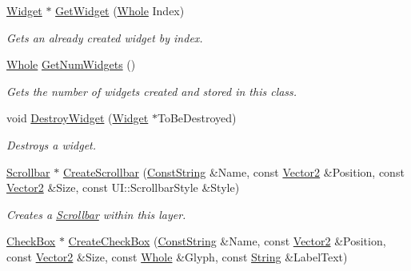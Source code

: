 \begin{DoxyCompactItemize}
\hyperlink{classphys_1_1UI_1_1Widget}{Widget} $\ast$ \hyperlink{classphys_1_1UI_1_1Layer_a8506cbb9fda26895300e4ade376754ab}{GetWidget} (\hyperlink{namespacephys_a460f6bc24c8dd347b05e0366ae34f34a}{Whole} Index)
\begin{DoxyCompactList}\small\item\em Gets an already created widget by index. \item\end{DoxyCompactList}\item 
\hyperlink{namespacephys_a460f6bc24c8dd347b05e0366ae34f34a}{Whole} \hyperlink{classphys_1_1UI_1_1Layer_a9501026d0546e37f2f7989a555f47500}{GetNumWidgets} ()
\begin{DoxyCompactList}\small\item\em Gets the number of widgets created and stored in this class. \item\end{DoxyCompactList}\item 
void \hyperlink{classphys_1_1UI_1_1Layer_a472de1771d8e80232292ec6a19c871a6}{DestroyWidget} (\hyperlink{classphys_1_1UI_1_1Widget}{Widget} $\ast$ToBeDestroyed)
\begin{DoxyCompactList}\small\item\em Destroys a widget. \item\end{DoxyCompactList}\item 
\hyperlink{classphys_1_1UI_1_1Scrollbar}{Scrollbar} $\ast$ \hyperlink{classphys_1_1UI_1_1Layer_a29f07dd621c99d2d5dbafd05ab7cc8a3}{CreateScrollbar} (\hyperlink{namespacephys_a5ce5049f8b4bf88d6413c47b504ebb31}{ConstString} \&Name, const \hyperlink{classphys_1_1Vector2}{Vector2} \&Position, const \hyperlink{classphys_1_1Vector2}{Vector2} \&Size, const UI::ScrollbarStyle \&Style)
\begin{DoxyCompactList}\small\item\em Creates a \hyperlink{classphys_1_1UI_1_1Scrollbar}{Scrollbar} within this layer. \item\end{DoxyCompactList}\item 
\hyperlink{classphys_1_1UI_1_1CheckBox}{CheckBox} $\ast$ \hyperlink{classphys_1_1UI_1_1Layer_a47ae847dbeea56ebccad238586e2542c}{CreateCheckBox} (\hyperlink{namespacephys_a5ce5049f8b4bf88d6413c47b504ebb31}{ConstString} \&Name, const \hyperlink{classphys_1_1Vector2}{Vector2} \&Position, const \hyperlink{classphys_1_1Vector2}{Vector2} \&Size, const \hyperlink{namespacephys_a460f6bc24c8dd347b05e0366ae34f34a}{Whole} \&Glyph, const \hyperlink{namespacephys_aa03900411993de7fbfec4789bc1d392e}{String} \&LabelText)

\end{DoxyCompactItemize}
